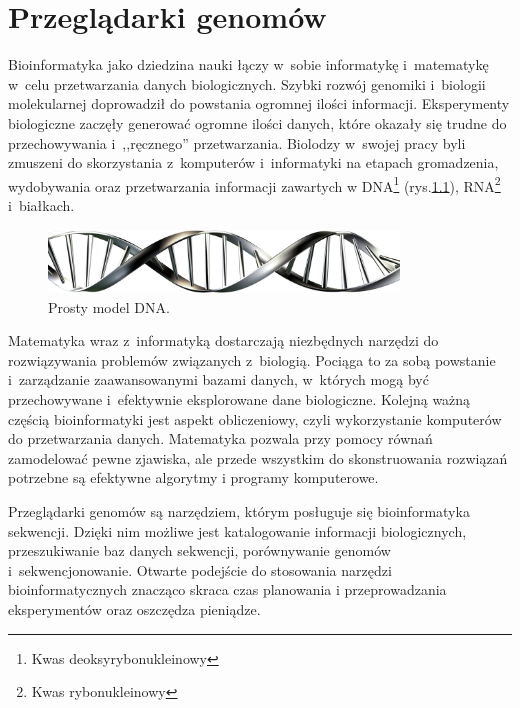 \documentclass[a4paper,12pt,oneside]{mwrep}  %
\begin{document}
\chapter{Przeglądarki genomów}

Bioinformatyka jako dziedzina nauki łączy w~sobie informatykę i~matematykę w~celu przetwarzania danych biologicznych. Szybki rozwój genomiki i~biologii molekularnej doprowadził do powstania ogromnej ilości informacji. Eksperymenty biologiczne zaczęły generować ogromne ilości danych, które okazały się trudne do przechowywania i~,,ręcznego'' przetwarzania. Biolodzy w~swojej pracy byli zmuszeni do skorzystania z~komputerów i~informatyki na etapach gromadzenia, wydobywania oraz przetwarzania informacji zawartych w DNA\footnote{Kwas deoksyrybonukleinowy} (rys.\ref{model-dna}), RNA\footnote{Kwas rybonukleinowy} i~białkach.

\begin{figure}[!h]
\centering
\includegraphics[width=0.83\textwidth]{grafika/DNA2}
\caption{Prosty model DNA.}
\label{model-dna}
\end{figure}

Matematyka wraz z~informatyką dostarczają niezbędnych narzędzi do rozwiązywania problemów związanych z~biologią. Pociąga to za sobą powstanie i~zarządzanie zaawansowanymi bazami danych, w~których mogą być przechowywane i~efektywnie eksplorowane dane biologiczne. Kolejną ważną częścią bioinformatyki jest aspekt obliczeniowy, czyli wykorzystanie komputerów do przetwarzania danych. Matematyka pozwala przy pomocy równań zamodelować pewne zjawiska, ale przede wszystkim do skonstruowania rozwiązań potrzebne są efektywne algorytmy i programy komputerowe.

Przeglądarki genomów są narzędziem, którym posługuje się bioinformatyka sekwencji. Dzięki nim możliwe jest katalogowanie informacji biologicznych, przeszukiwanie baz danych sekwencji, porównywanie genomów i~sekwencjonowanie. Otwarte podejście do stosowania narzędzi bioinformatycznych znacząco skraca czas planowania i przeprowadzania eksperymentów oraz oszczędza pieniądze.
\end{document}
